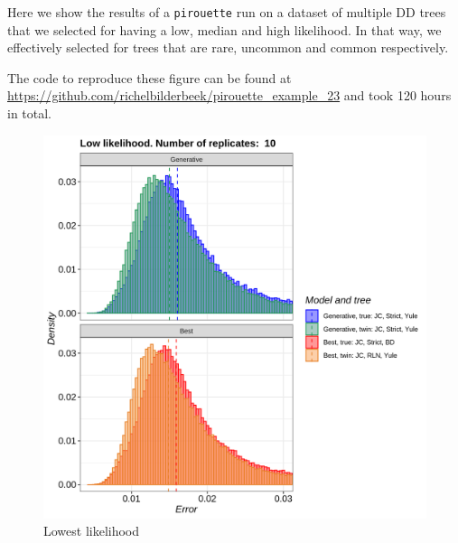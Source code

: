 Here we show the results of a \verb;pirouette; run on a dataset 
of multiple DD trees that we selected for having a low, median
and high likelihood. In that way, we effectively selected for trees
that are rare, uncommon and common respectively.

The code to reproduce these figure can be found at  
\url{https://github.com/richelbilderbeek/pirouette_example_23}
and took 120 hours in total.

\begin{figure}[H]
  \includegraphics[width=\textwidth]{pirouette_example_23/errors_low.png}
  \caption{Lowest likelihood}
\end{figure}

